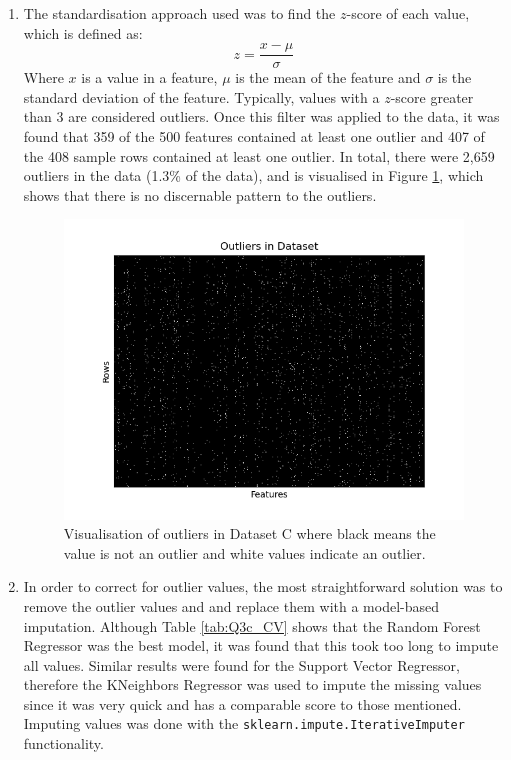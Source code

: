 \documentclass{article}
\begin{document}
\begin{enumerate}[label=\alph*)]
    \item The standardisation approach used was to find the $z$-score of each value, which is defined as:
    \begin{equation*}
        z = \frac{x - \mu}{\sigma}
    \end{equation*}
    Where $x$ is a value in a feature, $\mu$ is the mean of the feature and $\sigma$ is the standard deviation of the feature. Typically, values with a $z$-score greater than 3 are considered outliers. Once this filter was applied to the data, it was found that 359 of the 500 features contained at least one outlier and 407 of the 408 sample rows contained at least one outlier. In total, there were 2,659 outliers in the data (1.3\% of the data), and is visualised in Figure \ref{fig:Q3d_outliers}, which shows that there is no discernable pattern to the outliers.
    \begin{figure}[!htb]
        \centering
        \includegraphics[width=\textwidth]{Q3d_outliers.png}
        \caption{Visualisation of outliers in Dataset C where black means the value is not an outlier and white values indicate an outlier.}
        \label{fig:Q3d_outliers}
    \end{figure}

    \item In order to correct for outlier values, the most straightforward solution was to remove the outlier values and and replace them with a model-based imputation. Although Table \ref{tab:Q3c_CV} shows that the Random Forest Regressor was the best model, it was found that this took too long to impute all values. Similar results were found for the Support Vector Regressor, therefore the KNeighbors Regressor was used to impute the missing values since it was very quick and has a comparable score to those mentioned. Imputing values was done with the \verb|sklearn.impute.IterativeImputer| functionality.
    

\end{enumerate}
\end{document}
